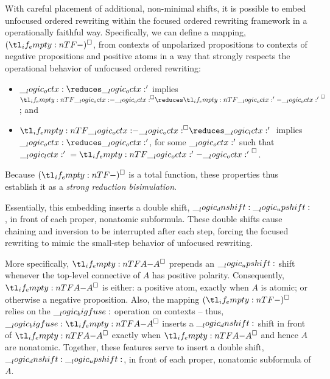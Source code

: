 With careful placement of additional, non-minimal shifts, it is possible to embed unfocused ordered rewriting within the focused ordered rewriting framework in a operationally faithful way.
Specifically, we can define a mapping, $\embed*{}$, from contexts of unpolarized propositions to contexts of negative propositions and positive atoms in a way that strongly respects the operational behavior of unfocused ordered rewriting:
\begin{itemize}[noitemsep]
\item $\octx \reduces \octx'$ implies $\embed{\octx} \reduces \embed{\octx'{}}$; and
\item $\embed{\octx} \reduces \np{\lctx'{}}$ implies $\octx \reduces \octx'$, for some $\__logic_octx:'$ such that $\np{\lctx'{}} = \embed{\octx'{}}$.
\end{itemize}
Because $\embed*{}$ is a total function, these properties thus establish it as a \emph{strong reduction bisimulation}\autocite{Sangiorgi+Walker:CUP03}.

Essentially, this embedding inserts a double shift, $\__logic_dnshift: \__logic_upshift:$, in front of each proper, nonatomic subformula.
These double shifts cause chaining and inversion to be interrupted after each step, forcing the focused rewriting to mimic the small-step behavior of unfocused rewriting.

More specifically, $\embed{A}$ prepends an $\__logic_upshift:$ shift whenever the top-level connective of $A$ has positive polarity.
Consequently, $\embed{A}$ is either: a positive atom, exactly when $A$ is atomic; or otherwise a negative proposition.
Also, the mapping $\embed*{}$ relies on the $\__logic_bigfuse:$ operation on contexts -- thus, $\bigfuse \embed{A}$ inserts a $\__logic_dnshift:$ shift in front of $\embed{A}$ exactly when $\embed{A}$ and hence $A$ are nonatomic.
Together, these features serve to insert a double shift, $\__logic_dnshift: \__logic_upshift:$, in front of each proper, nonatomic subformula of $A$.

